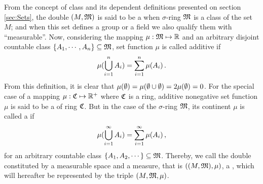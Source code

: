From the concept of class and its dependent definitions presented on section \ref{sec:Sets}, the double $(M,\mathfrak{M})$ is said to be a  when $\sigma$-ring $\mathfrak{M}$ is a class of the set $M$; and when this set defines a group or a field we also qualify them with ``measurable''. Now, considering the mapping $\mu : \mathfrak{M} \mapsto \mathbb{R}$ and an arbitrary disjoint countable class $\{A_1,\cdots,A_n\}\subseteq\mathfrak{M}$, set function $\mu$ is called additive if
\begin{equation}\label{eq:addMeasure}
\mu(\bigcup_{i=1}^nA_i)=\sum_{{i}=1}^n\mu(A_i)\,.
\end{equation}
From this definition, it is clear that $\mu(\emptyset)=\mu(\emptyset\cup\emptyset)=2\mu(\emptyset)=0$. For the special case of a mapping $\mu : \mathfrak{C} \mapsto \mathbb{R}^+$ where $\mathfrak{C}$ is a ring, additive nonegative set function $\mu$ is said to be a  of ring $\mathfrak{C}$. But in the case of the $\sigma$-ring $\mathfrak{M}$, its continent $\mu$ is called a  if
\begin{equation}\label{eq:measuSum}
\mu(\bigcup_{i=1}^\infty A_i)=\sum_{{i}=1}^\infty\mu(A_i)\,,
\end{equation}
for an arbitrary countable class $\{A_1,A_2,\cdots\}\subseteq\mathfrak{M}$. Thereby, we call the double constituted by a measurable space and a measure, that is $((M,\mathfrak{M}),\mu)$, a , which will hereafter be represented by the triple $(M,\mathfrak{M},\mu)$.


